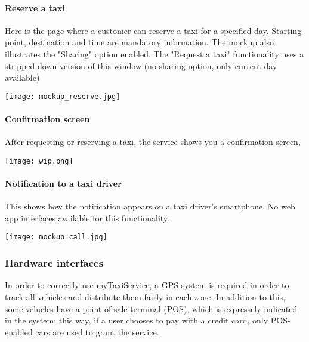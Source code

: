 \pagebreak
\paragraph{Reserve a taxi}
Here is the page where a customer can reserve a taxi for a specified day. Starting point, destination and time are mandatory information. The mockup also illustrates the "Sharing" option enabled. The "Request a taxi" functionality uses a stripped-down version of this window (no sharing option, only current day available)
\begin{center}
\texttt{[image: mockup\_reserve.jpg]}
\end{center}

\pagebreak
\paragraph{Confirmation screen}
After requesting or reserving a taxi, the service shows you a confirmation screen, 
\begin{center}
\texttt{[image: wip.png]}
\end{center}

\pagebreak
\paragraph{Notification to a taxi driver}
This shows how the notification appears on a taxi driver's smartphone. No web app interfaces available for this functionality.
\begin{center}
\texttt{[image: mockup\_call.jpg]}
\end{center}

\pagebreak
\subsubsection{Hardware interfaces}
In order to correctly use myTaxiService, a GPS system is required in order to track all vehicles and distribute them fairly in each zone. In addition to this, some vehicles have a point-of-sale terminal (POS), which is expressely indicated in the system; this way, if a user chooses to pay with a credit card, only POS-enabled cars are used to grant the service.


